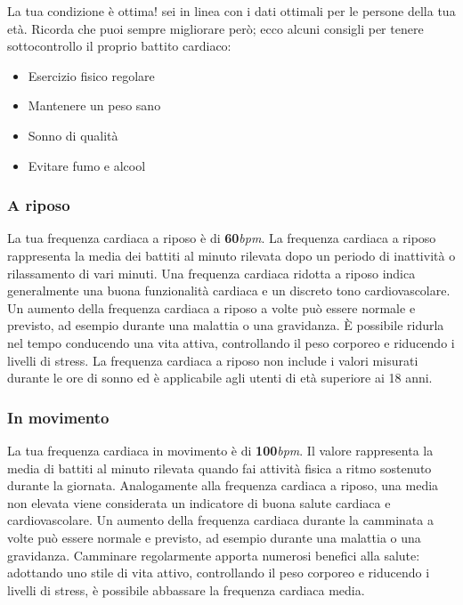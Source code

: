 \documentclass{article}
\begin{document}
La tua condizione è ottima! sei in linea con i dati ottimali per le persone della tua età. Ricorda che puoi sempre migliorare però; ecco alcuni consigli per tenere sottocontrollo il proprio battito cardiaco: 
\begin{itemize}
    \item Esercizio fisico regolare
    \item Mantenere un peso sano
    \item Sonno di qualità
    \item Evitare fumo e alcool
\end{itemize}



\subsubsection{A riposo}
La tua frequenza cardiaca a riposo è di \textbf{60}\textit{bpm}.
La frequenza cardiaca a riposo rappresenta la media dei battiti al minuto rilevata dopo un periodo di inattività o rilassamento di vari minuti. Una frequenza cardiaca ridotta a riposo indica generalmente una buona funzionalità cardiaca e un discreto tono cardiovascolare. Un aumento della frequenza cardiaca a riposo a volte può essere normale e previsto, ad esempio durante una malattia o una gravidanza.
È possibile ridurla nel tempo conducendo una vita attiva, controllando il peso corporeo e riducendo i livelli di stress. La frequenza cardiaca a riposo non include i valori misurati durante le ore di sonno ed è applicabile agli utenti di età superiore ai 18 anni.

\subsubsection{In movimento}
La tua frequenza cardiaca in movimento è di \textbf{100}\textit{bpm}.
Il valore rappresenta la media di battiti al minuto rilevata quando fai attività fisica a ritmo sostenuto durante la giornata.
Analogamente alla frequenza cardiaca a riposo, una media non elevata viene considerata un indicatore di buona salute cardiaca e cardiovascolare. Un aumento della frequenza cardiaca durante la camminata a volte può essere normale e previsto, ad esempio durante una malattia o una gravidanza. Camminare regolarmente apporta numerosi benefici alla salute: adottando uno stile di vita attivo, controllando il peso corporeo e riducendo i livelli di stress, è possibile abbassare la frequenza cardiaca media.
\end{document}
